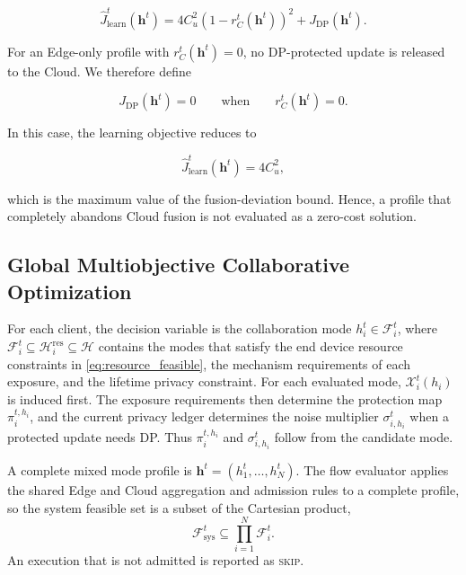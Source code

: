 \documentclass[5p,times]{elsarticle}
\theoremstyle{plain}
\theoremstyle{definition}
\theoremstyle{remark}
\begin{document}
\begin{equation}
\widehat J_{\mathrm{learn}}^t(\mathbf h^t)
=
4C_u^2
\left(
1-r_C^t(\mathbf h^t)
\right)^2
+
J_{\mathrm{DP}}(\mathbf h^t).
\label{eq:j_learn_objective}
\end{equation}

For an Edge-only profile with
\(r_C^t(\mathbf h^t)=0\), no DP-protected update is released to the Cloud.
We therefore define

\begin{equation}
J_{\mathrm{DP}}(\mathbf h^t)=0
\qquad
\text{when}
\qquad
r_C^t(\mathbf h^t)=0 .
\label{eq:edge_only_dp_cost}
\end{equation}

In this case, the learning objective reduces to

\begin{equation}
\widehat J_{\mathrm{learn}}^t(\mathbf h^t)
=
4C_u^2 ,
\end{equation}

which is the maximum value of the fusion-deviation bound. Hence, a profile
that completely abandons Cloud fusion is not evaluated as a zero-cost
solution.

\subsection{Global Multiobjective Collaborative Optimization}
\label{sec:global_optimization}

For each client, the decision variable is the collaboration mode
\(h_i^t\in\mathcal F_i^t\), where
\(\mathcal F_i^t\subseteq\mathcal H_i^{\mathrm{res}}\subseteq\mathcal H\)
contains the modes that satisfy the end device resource constraints in
\eqref{eq:resource_feasible}, the mechanism requirements of each exposure,
and the lifetime privacy constraint. For each evaluated mode, \(\mathcal X_i^t(h_i)\) is induced first. The exposure requirements then determine the protection map \(\pi_i^{t,h_i}\), and the current privacy ledger determines the noise multiplier \(\sigma_{i,h_i}^t\) when a protected update needs DP. Thus \(\pi_i^{t,h_i}\) and \(\sigma_{i,h_i}^t\) follow from the candidate mode.

A complete mixed mode profile is \(\mathbf h^t=(h_1^t,\ldots,h_N^t)\). The flow evaluator applies the shared Edge and Cloud aggregation and admission rules to a complete profile, so the system feasible set is a subset of the Cartesian product,
\begin{equation}
\mathcal F_{\mathrm{sys}}^t
\subseteq
\prod_{i=1}^{N}\mathcal F_i^t.
\label{eq:global_feasible_set}
\end{equation}
An execution that is not admitted is reported as \textsc{skip}.
\end{document}
